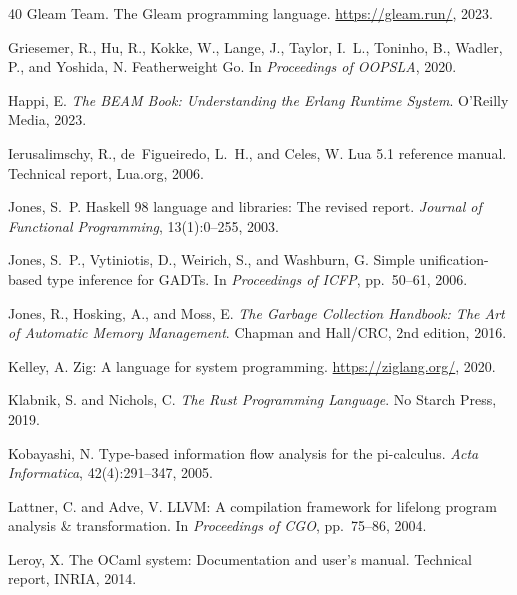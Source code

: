 \documentclass[11pt,twocolumn]{article}
\begin{document}
\begin{thebibliography}{40}
Gleam Team.
\newblock The Gleam programming language.
\newblock \url{https://gleam.run/}, 2023.

Griesemer, R., Hu, R., Kokke, W., Lange, J., Taylor, I.~L., Toninho, B., Wadler, P., and Yoshida, N.
\newblock Featherweight Go.
\newblock In \emph{Proceedings of OOPSLA}, 2020.

Happi, E.
\newblock \emph{The BEAM Book: Understanding the Erlang Runtime System}.
\newblock O'Reilly Media, 2023.

Ierusalimschy, R., de~Figueiredo, L.~H., and Celes, W.
\newblock Lua 5.1 reference manual.
\newblock Technical report, Lua.org, 2006.

Jones, S.~P.
\newblock Haskell 98 language and libraries: The revised report.
\newblock \emph{Journal of Functional Programming}, 13(1):0--255, 2003.

Jones, S.~P., Vytiniotis, D., Weirich, S., and Washburn, G.
\newblock Simple unification-based type inference for GADTs.
\newblock In \emph{Proceedings of ICFP}, pp.~50--61, 2006.

Jones, R., Hosking, A., and Moss, E.
\newblock \emph{The Garbage Collection Handbook: The Art of Automatic Memory Management}.
\newblock Chapman and Hall/CRC, 2nd edition, 2016.

Kelley, A.
\newblock Zig: A language for system programming.
\newblock \url{https://ziglang.org/}, 2020.

Klabnik, S. and Nichols, C.
\newblock \emph{The Rust Programming Language}.
\newblock No Starch Press, 2019.

Kobayashi, N.
\newblock Type-based information flow analysis for the pi-calculus.
\newblock \emph{Acta Informatica}, 42(4):291--347, 2005.

Lattner, C. and Adve, V.
\newblock LLVM: A compilation framework for lifelong program analysis \& transformation.
\newblock In \emph{Proceedings of CGO}, pp.~75--86, 2004.

Leroy, X.
\newblock The OCaml system: Documentation and user's manual.
\newblock Technical report, INRIA, 2014.


\end{thebibliography}
\end{document}
